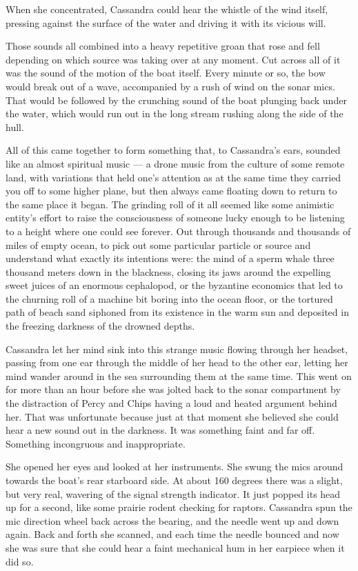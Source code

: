 \documentclass[
]{scrbook}
\begin{document}
When she concentrated, Cassandra could hear the whistle of the wind
itself, pressing against the surface of the water and driving it with
its vicious will.

Those sounds all combined into a heavy repetitive groan that rose and
fell depending on which source was taking over at any moment. Cut across
all of it was the sound of the motion of the boat itself. Every minute
or so, the bow would break out of a wave, accompanied by a rush of wind
on the sonar mics. That would be followed by the crunching sound of the
boat plunging back under the water, which would run out in the long
stream rushing along the side of the hull.

All of this came together to form something that, to Cassandra's ears,
sounded like an almost spiritual music --- a drone music from the
culture of some remote land, with variations that held one's attention
as at the same time they carried you off to some higher plane, but then
always came floating down to return to the same place it began. The
grinding roll of it all seemed like some animistic entity's effort to
raise the consciousness of someone lucky enough to be listening to a
height where one could see forever. Out through thousands and thousands
of miles of empty ocean, to pick out some particular particle or source
and understand what exactly its intentions were: the mind of a sperm
whale three thousand meters down in the blackness, closing its jaws
around the expelling sweet juices of an enormous cephalopod, or the
byzantine economics that led to the churning roll of a machine bit
boring into the ocean floor, or the tortured path of beach sand siphoned
from its existence in the warm sun and deposited in the freezing
darkness of the drowned depths.

Cassandra let her mind sink into this strange music flowing through her
headset, passing from one ear through the middle of her head to the
other ear, letting her mind wander around in the sea surrounding them at
the same time. This went on for more than an hour before she was jolted
back to the sonar compartment by the distraction of Percy and Chips
having a loud and heated argument behind her. That was unfortunate
because just at that moment she believed she could hear a new sound out
in the darkness. It was something faint and far off. Something
incongruous and inappropriate.

She opened her eyes and looked at her instruments. She swung the mics
around towards the boat's rear starboard side. At about 160 degrees
there was a slight, but very real, wavering of the signal strength
indicator. It just popped its head up for a second, like some prairie
rodent checking for raptors. Cassandra spun the mic direction wheel back
across the bearing, and the needle went up and down again. Back and
forth she scanned, and each time the needle bounced and now she was sure
that she could hear a faint mechanical hum in her earpiece when it did
so.
\end{document}

